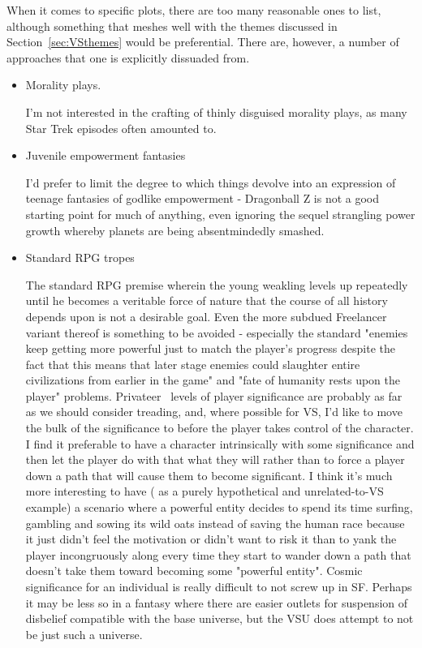 When it comes to specific plots, there are too many reasonable ones to
list, although something that meshes well with the themes discussed in
Section~\ref{sec:VSthemes} would be preferential. There are, however,
a number of approaches that one is explicitly dissuaded from. 
\begin{itemize}

\item Morality plays. 

I'm not interested in the crafting of thinly disguised morality plays,
as many Star Trek episodes often amounted to. 

\item Juvenile empowerment fantasies

I'd prefer to limit the degree to which things devolve into an
expression of teenage fantasies of godlike empowerment - Dragonball Z
is not a good starting point for much of anything, even ignoring the
sequel strangling power growth whereby planets are being
absentmindedly smashed.


\item Standard RPG tropes

The standard RPG premise wherein the young weakling levels up
repeatedly until he becomes a veritable force of nature that the
course of all history depends upon is not a desirable goal. Even the
more subdued Freelancer~\cite{Freelancer} variant thereof is something
to be avoided - especially the standard "enemies keep getting more
powerful just to match the player's progress despite the fact that
this means that later stage enemies could slaughter entire
civilizations from earlier in the game" and "fate of humanity rests
upon the player" problems. Privateer~\cite{Privateer} levels of player
significance are probably as far as we should consider treading, and,
where possible for VS, I'd like to move the bulk of the significance
to before the player takes control of the character. I find it
preferable to have a character intrinsically with some significance
and then let the player do with that what they will rather than to
force a player down a path that will cause them to become
significant. I think it's much more interesting to have ( as a purely
hypothetical and unrelated-to-VS example) a scenario where a powerful
entity decides to spend its time surfing, gambling and sowing its wild
oats instead of saving the human race because it just didn't feel the
motivation or didn't want to risk it than to yank the player
incongruously along every time they start to wander down a path that
doesn't take them toward becoming some "powerful entity". Cosmic
significance for an individual is really difficult to not screw up in
SF. Perhaps it may be less so in a fantasy where there are easier
outlets for suspension of disbelief compatible with the base universe,
but the VSU does attempt to not be just such a universe.


\end{itemize}
